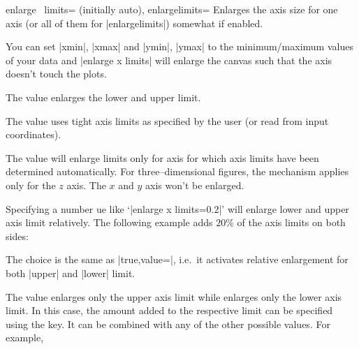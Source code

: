 \begin{pgfplotsxykeylist}{%
	enlarge \x\ limits= (initially auto),
	enlargelimits=}
Enlarges the axis size for one axis (or all of them for |enlargelimits|) somewhat if enabled.

You can set |xmin|, |xmax| and |ymin|, |ymax| to the minimum/maximum values of your data and |enlarge x limits| will enlarge the canvas such that the axis doesn't touch the plots.

	 The value  enlarges the lower and upper limit.

	 The value  uses tight axis limits as specified by the user (or read from input coordinates).

	 The value  will enlarge limits only for axis for which axis limits have been determined automatically.
	For three--dimensional figures, the  mechanism applies only for the $z$ axis. The $x$ and $y$ axis won't be enlarged. 
\begin{codeexample}[]
\end{codeexample}


	 Specifying a number ue like `|enlarge x limits=0.2|' will enlarge lower and upper axis limit relatively. The following example adds $20\%$ of the axis limits on both sides:
\begin{codeexample}[]
\end{codeexample}
	\noindent The choice  is the same as |true,value=|, i.e.\ it activates relative enlargement for both |upper| and |lower| limit.

	 The value  enlarges only the upper axis limit while  enlarges only the lower axis limit. In this case, the amount added to the respective limit can be specified using the  key. It can be combined with any of the other possible values. For example, 


\end{pgfplotsxykeylist}
